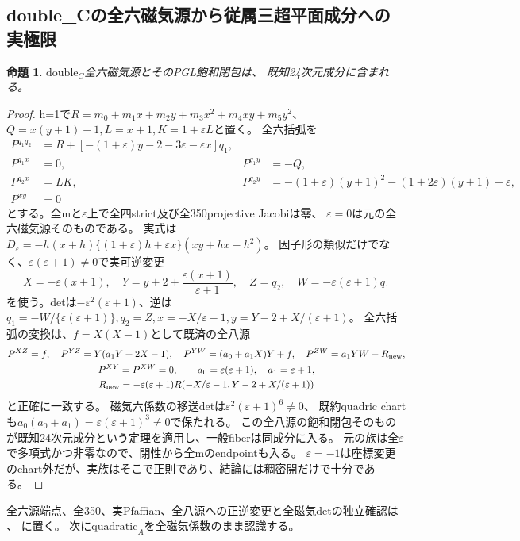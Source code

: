 \documentclass[a4paper,11pt]{ltjsarticle}
\newtheorem{proposition}{命題}[section]
\theoremstyle{definition}
\begin{document}
\subsection{double\_Cの全六磁気源から従属三超平面成分への実極限}
\begin{proposition}\label{prop:nil22-doubleC-dependent}
$\mathrm{double}_C$全六磁気源とそのPGL飽和閉包は、
既知24次元成分に含まれる。
\end{proposition}
\begin{proof}
h=1で$R=m_0+m_1x+m_2y+m_3x^2+m_4xy+m_5y^2$、
$Q=x(y+1)-1,L=x+1,K=1+\varepsilon L$と置く。
全六括弧を
\[
\begin{aligned}
 P^{q_1q_2}&=R+[-(1+\varepsilon)y-2-3\varepsilon-\varepsilon x]q_1,\\
 P^{q_1x}&=0,&P^{q_1y}&=-Q,\\
 P^{q_2x}&=LK,&P^{q_2y}&=-(1+\varepsilon)(y+1)^2-(1+2\varepsilon)(y+1)-\varepsilon,\\
 P^{xy}&=0
\end{aligned}
\]
とする。全mと$\varepsilon$上で全四strict及び全350projective Jacobiは零、
$\varepsilon=0$は元の全六磁気源そのものである。
実式は$D_\varepsilon=-h(x+h)\{(1+\varepsilon)h+\varepsilon x\}(xy+hx-h^2)$。
因子形の類似だけでなく、$\varepsilon(\varepsilon+1)\ne0$で実可逆変更
\[
 X=-\varepsilon(x+1),\quad Y=y+2+\frac{\varepsilon(x+1)}{\varepsilon+1},\quad
 Z=q_2,\quad W=-\varepsilon(\varepsilon+1)q_1
\]
を使う。detは$-\varepsilon^2(\varepsilon+1)$、逆は
$q_1=-W/\{\varepsilon(\varepsilon+1)\},q_2=Z,x=-X/\varepsilon-1,y=Y-2+X/(\varepsilon+1)$。
全六括弧の変換は、$f=X(X-1)$として既済の全八源
\[
\begin{gathered}
 P^{XZ}=f,\quad P^{YZ}=Y(a_1Y+2X-1),\quad
 P^{YW}=(a_0+a_1X)Y+f,\quad P^{ZW}=a_1YW-R_{\rm new},\\
 P^{XY}=P^{XW}=0,\qquad
 a_0=\varepsilon(\varepsilon+1),\quad a_1=\varepsilon+1,\\
 R_{\rm new}=-\varepsilon(\varepsilon+1)
 R(-X/\varepsilon-1,Y-2+X/(\varepsilon+1))
\end{gathered}
\]
と正確に一致する。
磁気六係数の移送detは$\varepsilon^2(\varepsilon+1)^6\ne0$、
既約quadric chartも$a_0(a_0+a_1)=\varepsilon(\varepsilon+1)^3\ne0$で保たれる。
この全八源の飽和閉包そのものが既知24次元成分という定理を適用し、一般fiberは同成分に入る。
元の族は全$\varepsilon$で多項式かつ非零なので、閉性から全mのendpointも入る。
$\varepsilon=-1$は座標変更のchart外だが、実族はそこで正則であり、結論には稠密開だけで十分である。
\end{proof}
全六源端点、全350、実Pfaffian、全八源への正逆変更と全磁気detの独立確認は
、
に置く。
次に$\mathrm{quadratic}_A$を全磁気係数のまま認識する。
\end{document}
